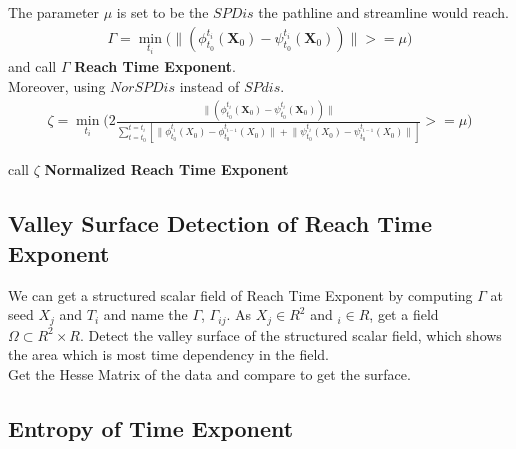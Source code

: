 \documentclass[
     11pt,         %
     a4paper,      %
     oneside,
     ]{article}
\newcommand{\vect}[1]{\boldsymbol{#1}}
\begin{document}
The parameter $\mu$ is set to be the $SPDis$ the pathline and streamline would reach.\\
\begin{eqnarray}
\Gamma=\min_{t_{i}}\biggr(\biggr\lVert(\phi_{t_{0}}^{t_{i}}(\vect{X}_{0})-\psi_{t_{0}}^{t_{i}}(\vect{X}_{0})) \biggr\rVert>=\mu\biggr)
\end{eqnarray}
and call $\Gamma$ \textbf{Reach Time Exponent}.\\
Moreover, using $NorSPDis$ instead of $SPdis$.\\
\begin{eqnarray}
\zeta=\min_{t_{i}}\biggr(2\frac{\biggr\lVert(\phi_{t_{0}}^{t_{i}}(\vect{X}_{0})-\psi_{t_{0}}^{t_{i}}(\vect{X}_{0})) \biggr\rVert}{\sum_{t=t_{0}}^{t=t_{i}}[\lVert\phi_{t_{0}}^{t_{i}}(X_{0})-\phi_{t_{0}}^{t_{i-1}}(X_{0})\rVert+\lVert\psi_{t_{0}}^{t_{i}}(X_{0})-\psi_{t_{0}}^{t_{i-1}}(X_{0})\rVert]}>=\mu\biggr)
\end{eqnarray}

call $\zeta$ \textbf{Normalized Reach Time Exponent}

\subsection{Valley Surface Detection of Reach Time Exponent}
We can get a structured scalar field of Reach Time Exponent by computing $\Gamma$ at seed $X_{j}$ and $T_{i}$ and name the $\Gamma$, $\Gamma_{ij}$. As $X_{j}\in R^{2}$ and $_{i} \in R$, get a field $\Omega \subset R^{2}\times R$. Detect the valley surface of the structured scalar field, which shows the area which is most time dependency in the field.\\
Get the Hesse Matrix of the data and compare to get the surface.


\subsection{Entropy of Time Exponent}
\end{document}
